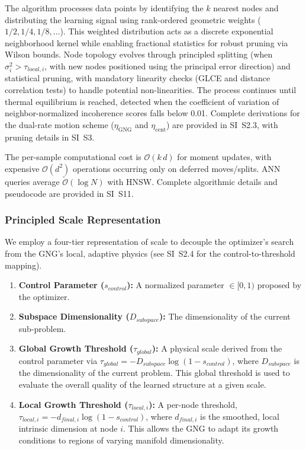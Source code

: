 \documentclass[11pt]{article}
\begin{document}
The algorithm processes data points by identifying the $k$ nearest nodes and distributing the learning signal using rank-ordered geometric weights ($1/2, 1/4, 1/8, \ldots$). This weighted distribution acts as a discrete exponential neighborhood kernel while enabling fractional statistics for robust pruning via Wilson bounds. Node topology evolves through principled splitting (when $\sigma_i^2 > \tau_{local,i}$, with new nodes positioned using the principal error direction) and statistical pruning, with mandatory linearity checks (GLCE and distance correlation tests) to handle potential non-linearities. The process continues until thermal equilibrium is reached, detected when the coefficient of variation of neighbor-normalized incoherence scores falls below 0.01. Complete derivations for the dual-rate motion scheme ($\eta_{\mathrm{GNG}}$ and $\eta_{\mathrm{cent}}$) are provided in SI~S2.3, with pruning details in SI~S3.

The per-sample computational cost is $\mathcal O(k\,d)$ for moment updates, with expensive $\mathcal O(d^2)$ operations occurring only on deferred moves/splits. ANN queries average $\tilde{\mathcal O}(\log N)$ with HNSW. Complete algorithmic details and pseudocode are provided in SI~S11.


\subsubsection{Principled Scale Representation}
We employ a four-tier representation of scale to decouple the optimizer's search from the GNG's local, adaptive physics (see SI~S2.4 for the control-to-threshold mapping).
\begin{enumerate}
    \item \textbf{Control Parameter ($s_{control}$):} A normalized parameter $\in [0,1)$ proposed by the optimizer.
    \item \textbf{Subspace Dimensionality ($D_{subspace}$):} The dimensionality of the current sub-problem.
    \item \textbf{Global Growth Threshold ($\tau_{global}$):} A physical scale derived from the control parameter via $\tau_{global} = -D_{subspace} \log(1 - s_{control})$, where $D_{subspace}$ is the dimensionality of the current problem. This global threshold is used to evaluate the overall quality of the learned structure at a given scale.
    \item \textbf{Local Growth Threshold ($\tau_{local,i}$):} A per-node threshold, $\tau_{local,i} = -d_{final,i} \log(1 - s_{control})$, where $d_{final,i}$ is the smoothed, local intrinsic dimension at node $i$. This allows the GNG to adapt its growth conditions to regions of varying manifold dimensionality.
\end{enumerate}
\end{document}
